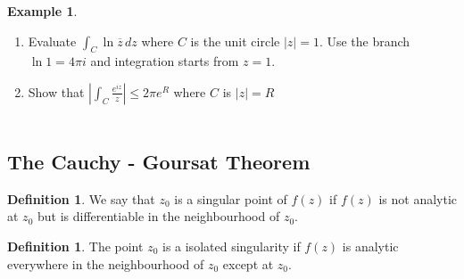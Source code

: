 \documentclass[11pt,a4paper]{article}
\theoremstyle{definition}
\newtheorem{definition}[thm]{Definition}
\newtheorem{example}[thm]{Example}
\begin{document}
\begin{example}
\begin{enumerate}
\item Evaluate $\displaystyle{\int_C \ln \overline{z}\,dz}$ where $C$ is the unit circle $\left|z\right| = 1$. Use the branch $\ln 1 = 4\pi i$ and integration starts from $ z = 1$.

\item Show that $\displaystyle{\left|\displaystyle{\int_C \frac{e^{iz}}{z}}\right|\leq 2\pi e^R}$ where $C$ is $\left|z\right|  = R$\\\\
\end{enumerate}
\end{example}











{\color[wave]{485}\subsection{The Cauchy - Goursat Theorem}}

\begin{definition}
We say that $z_0$ is a singular point of $f(z)$ if $f(z)$ is not analytic at $z_0$ but is differentiable in the neighbourhood of $z_0$.
\end{definition}

\begin{definition}
The point $z_0$ is a isolated singularity if $f(z)$ is analytic everywhere in the neighbourhood of $z_0$ except at $z_0$.
\end{definition}
\end{document}
